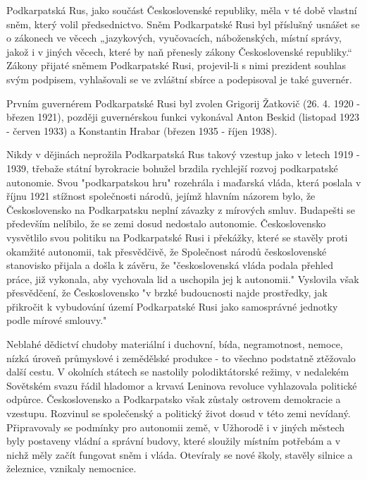 \documentclass[10pt,a5paper,twoside]{book}
\begin{document}
Podkarpatská Rus, jako součást Československé republiky, měla v té době vlastní sněm, který volil předsednictvo. Sněm Podkarpatské Rusi byl příslušný usnášet se o zákonech ve věcech „jazykových, vyučovacích, náboženských, místní správy, jakož i v jiných věcech, které by naň přenesly zákony Československé republiky.“ Zákony přijaté sněmem Podkarpatské Rusi, projevil-li s nimi prezident souhlas svým podpisem, vyhlašovali se ve zvláštní sbírce a podepisoval je také guvernér. 
\par Prvním guvernérem Podkarpatské Rusi byl zvolen Grigorij Žatkovič (26. 4. 1920 - březen 1921), později guvernérskou funkci vykonával Anton Beskid (listopad 1923 - červen 1933) a Konstantin Hrabar (březen 1935 - říjen 1938).
\par Nikdy v dějinách neprožila Podkarpatská Rus takový vzestup jako v letech 1919 - 1939, třebaže státní byrokracie bohužel brzdila rychlejší rozvoj podkarpatské autonomie. Svou "podkarpatskou hru" rozehrála i maďarská vláda, která poslala v říjnu 1921 stížnost společnosti národů, jejímž hlavním názorem bylo, že Československo na Podkarpatsku neplní závazky z mírových smluv. Budapešti se především nelíbilo, že se zemi dosud nedostalo autonomie. Československo vysvětlilo svou politiku na Podkarpatské Rusi i překážky, které se stavěly proti okamžité autonomii, tak přesvědčivě, že Společnost národů československé stanovisko přijala a došla k závěru, že "československá vláda podala přehled práce, již vykonala, aby vychovala lid a uschopila jej k autonomii." Vyslovila však přesvědčení, že Československo "v brzké budoucnosti najde prostředky, jak přikročit k vybudování území Podkarpatské Rusi jako samosprávné jednotky podle mírové smlouvy." 
\par Neblahé dědictví chudoby materiální i duchovní, bída, negramotnost, nemoce, nízká úroveň průmyslové i zemědělské produkce - to všechno podstatně ztěžovalo další cestu. V okolních státech se nastolily polodiktátorské režimy, v nedalekém Sovětském svazu řádil hladomor a krvavá Leninova revoluce vyhlazovala politické odpůrce. Československo a Podkarpatsko však zůstaly ostrovem demokracie a vzestupu. Rozvinul se společenský a politický život dosud v této zemi nevídaný. Připravovaly se podmínky pro autonomii země, v Užhorodě i v jiných městech byly postaveny vládní a správní budovy, které sloužily místním potřebám a v nichž měly začít fungovat sněm i vláda. Otevíraly se nové školy, stavěly silnice a železnice, vznikaly nemocnice. 
\end{document}
